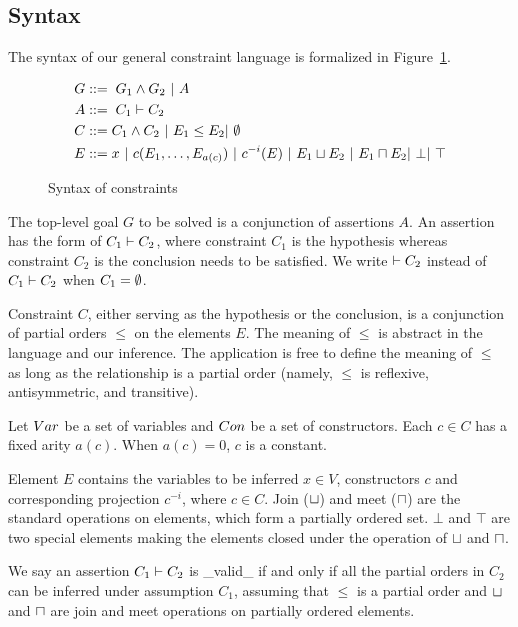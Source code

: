 \subsection{Syntax}

The syntax of our general constraint language is formalized in
Figure~\ref{figure:lang:syntax}.

\begin{figure}
\begin{align*}
G &::=\; G_1 \land G_2\ |\ A \\
A &::=\; C_1 \vdash C_2 \\
C &::= C_1 \land C_2\ |\  E_1 \leq E_2 |\ \emptyset \\
E &::= x\ |\ c(E_1,\dots,E_{a(c)})\ |\ c^{-i}(E)\ |\ E_1 \sqcup E_2 \
|\ E_1 \sqcap E_2 |\ \bot |\ \top
\end{align*}
\caption{Syntax of constraints}
\label{figure:lang:syntax}
\end{figure}

The top-level goal $G$ to be solved is a conjunction of assertions $A$. An
assertion has the form of $C_1 \vdash C_2$, where constraint $C_1$ is the
hypothesis whereas constraint $C_2$ is the conclusion needs to be satisfied. We
write $ \vdash C_2$ instead of $ C_1 \vdash C_2$ when $C_1=\emptyset$.

Constraint $C$, either serving as the hypothesis or the conclusion, is a
conjunction of partial orders $\leq$ on the elements $E$. The meaning
of $\leq$ is abstract in the language and our inference. The
application is free to define the meaning of $\leq$ as long as the
relationship is a partial order (namely, $\leq$ is reflexive,
antisymmetric, and transitive).

Let $Var$ be a set of variables and $Con$ be a set of constructors.
Each $c\in C$ has a fixed arity $a(c)$. When $a(c)=0$, $c$ is a constant.

Element $E$ contains the variables to be inferred $x\in V$,
constructors $c$ and corresponding projection $c^{-i}$, where $c\in
C$. Join ($\sqcup$) and meet ($\sqcap$) are the standard operations on
elements, which form a partially ordered set. $\bot$ and $\top$ are
two special elements making the elements closed under the operation of
$\sqcup$ and $\sqcap$.


We say an assertion $C_1 \vdash C_2$ is _valid_ if and only if all
the partial orders in $C_2$ can be inferred under assumption $C_1$,
assuming that $\leq$ is a partial order and $\sqcup$ and $\sqcap$ are
join and meet operations on partially ordered elements.

